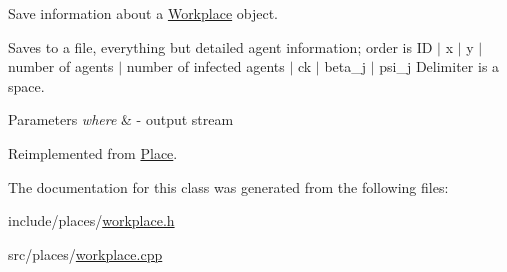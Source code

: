 Save information about a \hyperlink{classWorkplace}{Workplace} object. 

Saves to a file, everything but detailed agent information; order is ID $\vert$ x $\vert$ y $\vert$ number of agents $\vert$ number of infected agents $\vert$ ck $\vert$ beta\+\_\+j $\vert$ psi\+\_\+j Delimiter is a space. 
\begin{DoxyParams}{Parameters}
{\em where} & -\/ output stream \\
\hline
\end{DoxyParams}


Reimplemented from \hyperlink{classPlace_a9aa7649e0b91c5f61a5f71e9ca808fe1}{Place}.



The documentation for this class was generated from the following files\+:\begin{DoxyCompactItemize}
\item 
include/places/\hyperlink{workplace_8h}{workplace.\+h}\item 
src/places/\hyperlink{workplace_8cpp}{workplace.\+cpp}\end{DoxyCompactItemize}
